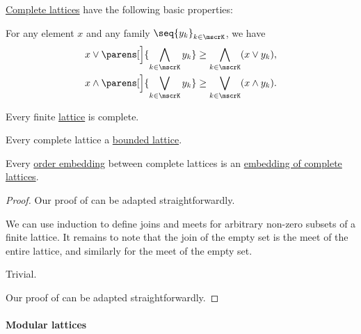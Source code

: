 \begin{proposition}\label{thm:def:complete_lattice}
  \hyperref[def:complete_lattice]{Complete lattices} have the following basic properties:
  \begin{thmenum}
     For any element \( x \) and any family \( \seq{ y_k }_{k \in \mscrK} \), we have
    \begin{align}
      x \vee \parens[\Big]{ \bigwedge_{k \in \mscrK} y_k } &\geq \bigwedge_{k \in \mscrK} (x \vee y_k), \label{eq:thm:def:complete_lattice/distributive_inequality/join_over_meet} \\
      x \wedge \parens[\Big]{ \bigvee_{k \in \mscrK} y_k } &\geq \bigvee_{k \in \mscrK} (x \wedge y_k). \label{eq:thm:def:complete_lattice/distributive_inequality/meet_over_join}
    \end{align}

     Every finite \hyperref[def:lattice]{lattice} is complete.

     Every complete lattice a \hyperref[def:bounded_lattice]{bounded lattice}.

     Every \hyperref[def:preordered_set/homomorphism]{order embedding} between complete lattices is an \hyperref[def:lattice/homomorphism]{embedding of complete lattices}.
  \end{thmenum}
\end{proposition}
\begin{proof}
   Our proof of  can be adapted straightforwardly.

   We can use induction to define joins and meets for arbitrary non-zero subsets of a finite lattice. It remains to note that the join of the empty set is the meet of the entire lattice, and similarly for the meet of the empty set.

   Trivial.

   Our proof of  can be adapted straightforwardly.
\end{proof}

\paragraph{Modular lattices}

